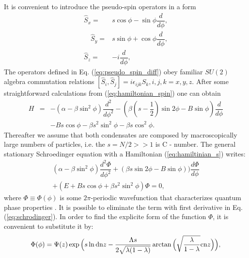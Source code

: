 \documentclass[aps, pre, preprint, groupedaddress, superscriptaddress, showkeys, showpacs] {revtex4-1}
\begin{document}
It is convenient to introduce the pseudo-spin operators in a form
% 
\begin{subequations}
\begin{align}
\hat{S}_x = & s \cos{\phi} - \sin{\phi} \dfrac{d}{d \phi}, \\
\quad \hat{S}_y = & s \sin{\phi} + \cos{\phi} \dfrac{d}{d \phi}, \\
\hat{S}_z = & -i\dfrac{d}{d \phi},
\end{align}
\label{eq:pseudo_spin_diff}
\end{subequations}
%
The operators defined in Eq. (\ref{eq:pseudo_spin_diff}) obey familiar $SU(2)$ algebra commutation relations $[\hat{S}_i, \hat{S}_j] = i\epsilon_{ijk}\hat{S}_k,  i,j,k=x,y,z$.
After some straightforward calculations from (\ref{eq:hamiltonian_spin}) one can obtain
%
\begin{equation}
\begin{array}{lcl}
H & = & -(\alpha - \beta \sin^2 \phi) \dfrac{d^2}{d \phi^2} - (\beta(s-\dfrac{1}{2})\sin{2\phi} - B\sin{\phi}) \dfrac{d}{d \phi} \\
&& - Bs \cos \phi - \beta s^2 \sin^2 \phi - \beta s \cos^2 \phi.
\end{array}
\label{eq:hamiltinian_s}
\end{equation}
%
Thereafter we assume that both condensates are composed by macroscopically large numbers of particles, i.e. the $s = N/2 >> 1$ is C - number.
The general stationary Schroedinger equation with a Hamiltonian (\ref{eq:hamiltinian_s}) writes:
%
\begin{equation}
\begin{array}{l}
(\alpha - \beta \sin^2 \phi) \dfrac{d^2 \Phi}{d \phi^2} + (\beta s\sin{2\phi}-B\sin{\phi})) \dfrac{d \Phi}{d \phi} \\
+ (E + B s \cos \phi + \beta s^2 \sin^2 \phi) \Phi = 0,
\end{array}
\label{eq:schrodinger}
\end{equation}
%
where $\Phi \equiv \Phi(\phi)$ is some $2\pi$-periodic wavefunction that characterizes quantum phase properties \cite{Anglin}.
It is possible to eliminate the term with first derivative in Eq. (\ref{eq:schrodinger}).
In order to find the explicite form of the function $\Phi$, it is convenient to substitute it by:
%
\begin{equation}
\Phi(\phi) = \Psi(z) \exp \Big( s \ln \textrm{dn}{z} - \dfrac{\Lambda s}{2 \sqrt{\lambda (1 - \lambda)}} \arctan \Big( \sqrt{\dfrac{\lambda}{1 - \lambda}} \textrm{cn}{z} \Big) \Big),
\label{eq:transformation_of_phi}
\end{equation}
\end{document}
